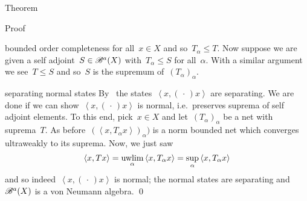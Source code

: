 \documentclass[b]{subfiles}
\begin{document}
\begin{parsec}
\begin{point}{Theorem}
\begin{point}{Proof}
\begin{point}{bounded order completeness}
    for all~$x \in X$ and so~$T_\alpha \leq T$.
Now suppose we are given a self adjoint~$S \in \mathscr{B}^a(X)$
    with~$T_\alpha \leq S$ for all~$\alpha$.
With a similar argument we see~$T \leq S$ and so~$S$ is
    the supremum of~$(T_\alpha)_\alpha$.
\end{point}
\begin{point}{separating normal states}%
By~
    the states~$\left<x,(\,\cdot\,)x\right>$
    are separating.
We are done if we can show~$\left<x,(\,\cdot\,)x\right>$
    is normal, i.e.~preserves suprema of self adjoint elements.
To this end, pick~$x \in X$ and let~$(T_\alpha)_\alpha$
    be a net with suprema~$T$.
As before~$(\left<x,T_\alpha x\right>)_\alpha)$
    is a norm bounded net which converges ultraweakly to its
    suprema.
Now, we just saw
\begin{equation*}
    \left<x,Tx\right> = \uwlim_\alpha \left<x, T_\alpha x\right>
                = \sup_\alpha \left<x, T_\alpha x\right>
\end{equation*}
and so indeed~$\left<x, (\,\cdot\,)x\right>$ is normal;
the normal states are separating
and~$\mathscr{B}^a(X)$ is a von Neumann algebra. \qed
\end{point}
\end{point}
\end{point}
\end{parsec}
\end{document}
